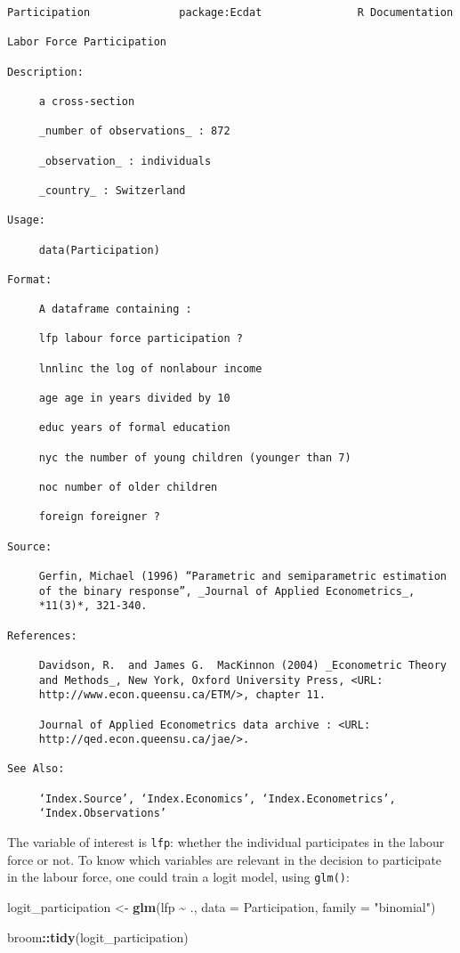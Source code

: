 \documentclass[
]{article}
\newenvironment{Shaded}{\begin{snugshade}}{\end{snugshade}}
\newcommand{\DataTypeTok}[1]{\textcolor[rgb]{0.13,0.29,0.53}{#1}}
\newcommand{\KeywordTok}[1]{\textcolor[rgb]{0.13,0.29,0.53}{\textbf{#1}}}
\newcommand{\NormalTok}[1]{#1}
\newcommand{\OperatorTok}[1]{\textcolor[rgb]{0.81,0.36,0.00}{\textbf{#1}}}
\newcommand{\StringTok}[1]{\textcolor[rgb]{0.31,0.60,0.02}{#1}}
\begin{document}
\begin{verbatim}
Participation              package:Ecdat               R Documentation

Labor Force Participation

Description:

     a cross-section

     _number of observations_ : 872

     _observation_ : individuals

     _country_ : Switzerland

Usage:

     data(Participation)

Format:

     A dataframe containing :

     lfp labour force participation ?

     lnnlinc the log of nonlabour income

     age age in years divided by 10

     educ years of formal education

     nyc the number of young children (younger than 7)

     noc number of older children

     foreign foreigner ?

Source:

     Gerfin, Michael (1996) “Parametric and semiparametric estimation
     of the binary response”, _Journal of Applied Econometrics_,
     *11(3)*, 321-340.

References:

     Davidson, R.  and James G.  MacKinnon (2004) _Econometric Theory
     and Methods_, New York, Oxford University Press, <URL:
     http://www.econ.queensu.ca/ETM/>, chapter 11.

     Journal of Applied Econometrics data archive : <URL:
     http://qed.econ.queensu.ca/jae/>.

See Also:

     ‘Index.Source’, ‘Index.Economics’, ‘Index.Econometrics’,
     ‘Index.Observations’
\end{verbatim}

The variable of interest is \texttt{lfp}: whether the individual participates in the labour force or not.
To know which variables are relevant in the decision to participate in the labour force, one could
train a logit model, using \texttt{glm()}:

\begin{Shaded}
\begin{Highlighting}[]
\NormalTok{logit\_participation \textless{}{-}}\StringTok{ }\KeywordTok{glm}\NormalTok{(lfp }\OperatorTok{\textasciitilde{}}\StringTok{ }\NormalTok{., }\DataTypeTok{data =}\NormalTok{ Participation, }\DataTypeTok{family =} \StringTok{"binomial"}\NormalTok{)}

\NormalTok{broom}\OperatorTok{::}\KeywordTok{tidy}\NormalTok{(logit\_participation)}
\end{Highlighting}
\end{Shaded}
\end{document}
